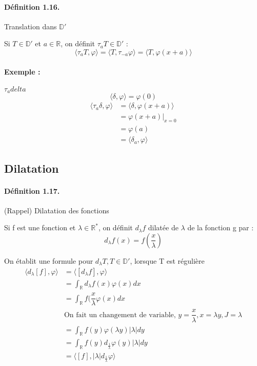 \documentclass[12pt,a4paper]{report}
\newcommand{\ens}[1]{\mathbb{#1}}
\begin{document}
\paragraph{Définition 1.16.} Translation dans \(\ens{D}'\)

Si \(T \in \ens{D}'\) et \(a \in \ens{R}\), on définit \(\tau_a T \in \ens{D}'\) :
\[
	\langle \tau_a T, \varphi \rangle = \langle T, \tau_{-a} \varphi \rangle = \langle T, \varphi(x+a) \rangle
\]

\paragraph{Exemple :} \(\tau_a delta\)
\[
	\langle \delta, \varphi \rangle = \varphi(0)
\]
\begin{align*}
	\langle \tau_a \delta, \varphi \rangle &= \langle \delta, \varphi(x+a) \rangle\\
	&= \varphi (x+a)\vert_{x = 0}\\
	&= \varphi(a)\\
	&= \langle \delta_a, \varphi \rangle
\end{align*}

\subsection{Dilatation}

\paragraph{Définition 1.17.} (Rappel) Dilatation des fonctions

Si f est une fonction et \(\lambda \in \ens{R^*}\), on définit \(d_\lambda f\) dilatée de \(\lambda\) de la fonction g par :
\[
	d_\lambda f (x) = f(\dfrac{x}{\lambda}) 
\]

On établit une formule pour \(d_\lambda T, T \in \ens{D'}\), lorsque T est régulière
\begin{align*}
	\langle d_\lambda [f], \varphi \rangle &= \langle \left[d_\lambda f\right], \varphi \rangle\\
	&= \int_{\ens{R}} d_\lambda f(x) \varphi(x) dx\\
	&= \int_{\ens{R}} f(\dfrac{x}{\lambda} \varphi(x) dx\\
	& \text{On fait un changement de variable, } y= \dfrac{x}{\lambda}, x = \lambda y, J = \lambda\\
	&= \int_{\ens{R}} f(y) \varphi (\lambda y) \vert \lambda \vert dy\\
	&= \int_{\ens{R}} f(y) d_{\frac{1}{\lambda}}\varphi (y) \vert \lambda \vert dy\\
	&= \langle [f], \vert \lambda \vert d_{\frac{1}{\lambda}} \varphi \rangle
\end{align*}
\end{document}
